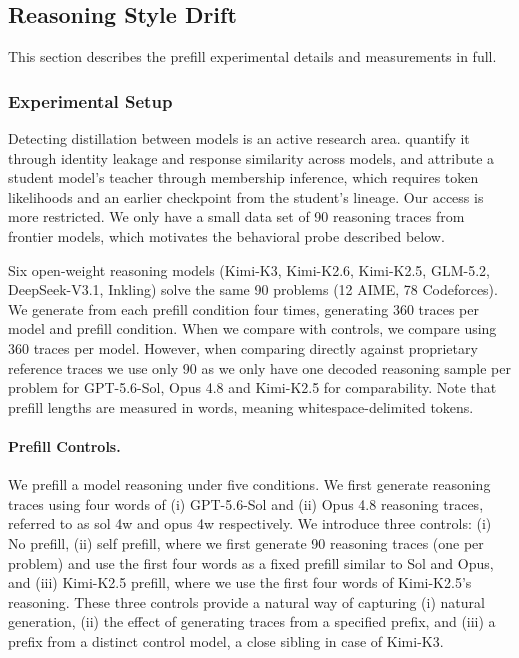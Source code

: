 \clearpage
\subsection{Reasoning Style Drift}\label{app:reasoning_drift}

This section describes the prefill experimental details and measurements in full.


\subsubsection{Experimental Setup}\label{app:drift_setup}

Detecting distillation between models is an active research area. \citet{lee2025quantification} quantify it through identity leakage and response similarity across models, and \citet{rawat2026reference} attribute a student model's teacher through membership inference, which requires token likelihoods and an earlier checkpoint from the student's lineage. Our access is more restricted. We only have a small data set of 90 reasoning traces from frontier models, which motivates the behavioral probe described below.

Six open-weight reasoning models (Kimi-K3, Kimi-K2.6, Kimi-K2.5, GLM-5.2, DeepSeek-V3.1, Inkling) solve the same 90 problems (12 AIME, 78 Codeforces). We generate from each prefill condition four times, generating 360 traces per model and prefill condition. When we compare with controls, we compare using 360 traces per model. However, when comparing directly against proprietary reference traces we use only 90 as we only have one decoded reasoning sample per problem for GPT-5.6-Sol, Opus 4.8 and Kimi-K2.5 for comparability. Note that prefill lengths are measured in words, meaning whitespace-delimited tokens.

\paragraph{Prefill Controls.} We prefill a model reasoning under five conditions. We first generate reasoning traces using four words of (i) GPT-5.6-Sol and (ii) Opus 4.8 reasoning traces, referred to as sol 4w and opus 4w respectively. We introduce three controls: (i) No prefill, (ii) self prefill, where we first generate 90 reasoning traces (one per problem) and use the first four words as a fixed prefill similar to Sol and Opus, and (iii) Kimi-K2.5 prefill, where we use the first four words of Kimi-K2.5's reasoning. These three controls provide a natural way of capturing (i) natural generation, (ii) the effect of generating traces from a specified prefix, and (iii)  a prefix from a distinct control model, a close sibling in case of Kimi-K3.


